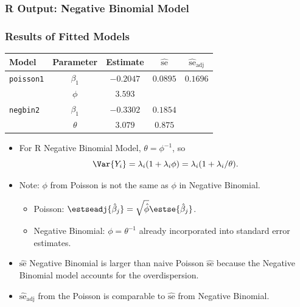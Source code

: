 \documentclass[oneside]{book}\usepackage[]{graphicx}\usepackage[svgnames]{xcolor}
\makeatletter
\newenvironment{kframe}{%
 \def\at@end@of@kframe{}%
 \ifinner\ifhmode%
  \def\at@end@of@kframe{\end{minipage}}%
  \begin{minipage}{\columnwidth}%
 \fi\fi%
 \def\FrameCommand##1{\hskip\@totalleftmargin \hskip-\fboxsep
 \colorbox{shadecolor}{##1}\hskip-\fboxsep
     \hskip-\linewidth \hskip-\@totalleftmargin \hskip\columnwidth}%
 \MakeFramed {\advance\hsize-\width
   \@totalleftmargin\z@ \linewidth\hsize
   \@setminipage}}%
 {\par\unskip\endMakeFramed%
 \at@end@of@kframe}
\newenvironment{knitrout}{}{} %
\makeatother
\begin{document}
\subsubsection*{R Output: Negative Binomial Model}
\begin{knitrout}
\color{fgcolor}\begin{kframe}


{\ttfamily\noindent\bfseries\color{errorcolor}{Error in summary(negbin2): object 'negbin2' not found}}\end{kframe}
\end{knitrout}
\subsubsection*{Results of Fitted Models}
\begin{table}[H]
    \centering
    \begin{tabular}{lcccc}
        Model             & Parameter   & Estimate    & $ \widehat{\text{se}} $ & $ \widehat{\text{se}}_{\text{adj}} $ \\
        \midrule
        \texttt{poisson1} & $ \beta_1 $ & $ -0.2047 $ & $ 0.0895 $              & $0.1696$                             \\
                          & $ \phi $    & $3.593$                                                                      \\
        \texttt{negbin2}  & $ \beta_1 $ & $ -0.3302 $ & $ 0.1854 $                                                     \\
                          & $ \theta $  & $3.079$     & $0.875$                                                        \\
        \bottomrule
    \end{tabular}
\end{table}
\begin{itemize}
    \item For R Negative Binomial Model, $ \theta=\phi^{-1} $, so
          \[ \Var{Y_i}=\lambda_i(1+\lambda_i\phi)=\lambda_i(1+\lambda_i/\theta). \]
    \item Note: $ \phi $ from Poisson is not the same as $ \phi $ in Negative Binomial.
          \begin{itemize}
              \item Poisson: $ \estseadj{\hat{\beta}_j}=\sqrt{\hat{\phi}}\estse{\hat{\beta}_j} $.
              \item Negative Binomial: $ \phi=\theta^{-1} $ already incorporated into standard error estimates.
          \end{itemize}
    \item $ \widehat{\text{se}} $ Negative Binomial is larger than naive Poisson $ \widehat{\text{se}} $
          because the Negative Binomial model accounts for the overdispersion.
    \item $ \widehat{\text{se}}_{\text{adj}} $ from the Poisson is comparable to $ \widehat{\text{se}} $ from Negative Binomial.
\end{itemize}
\end{document}
